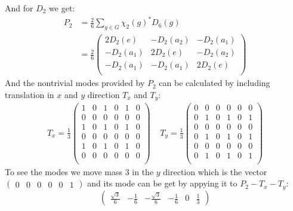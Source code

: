 \documentclass[a4paper]{article}
\theoremstyle{definition}
\theoremstyle{definition}
\theoremstyle{definition}
\theoremstyle{theorem}
\theoremstyle{theorem}
\theoremstyle{definition}
\begin{document}
And for $D_2$ we get:
\begin{align}
    P_2 &= \frac{2}{6} \sum _{g\in G} \chi _{2}(g)^* D_6(g) \nonumber \\
        &=\frac{2}{6}
        \begin{pmatrix}
            2D_2(e) & -D_2(a_2) & -D_2(a_1) \\
            -D_2(a_1) & 2D_2(e) & -D_2(a_2)\\
            -D_2(a_1) & -D_2(a_1) & 2D_2(e) \\
        \end{pmatrix} \nonumber
\end{align}
And the nontrivial modes provided by $P_2$ can be calculated by including translation in $x$ and $y$
direction $T_x$ and $T_y$:
\begin{align}
    T_x = \frac{1}{3}
\begin{pmatrix}
    1 & 0 & 1 & 0 & 1 & 0 \\
    0 & 0 & 0 & 0 & 0 & 0 \\
    1 & 0 & 1 & 0 & 1 & 0 \\
    0 & 0 & 0 & 0 & 0 & 0 \\
    1 & 0 & 1 & 0 & 1 & 0 \\
    0 & 0 & 0 & 0 & 0 & 0 \\
\end{pmatrix}
    \;\;\;\;
    T_y = \frac{1}{3}
\begin{pmatrix}
    0 & 0 & 0 & 0 & 0 & 0 \\
    0 & 1 & 0 & 1 & 0 & 1 \\
    0 & 0 & 0 & 0 & 0 & 0 \\
    0 & 1 & 0 & 1 & 0 & 1 \\
    0 & 0 & 0 & 0 & 0 & 0 \\
    0 & 1 & 0 & 1 & 0 & 1 \\
\end{pmatrix}
\end{align}
To see the modes we move mass $3$ in the $y$ direction which is the vector $\begin{pmatrix}0&0&0&0&0&1\end{pmatrix}$ and its mode can be get by appying it to $P_2 -T_x -T_y$:
\begin{equation}
    \begin{pmatrix}
        \frac{\sqrt{3}}{6}&-\frac{1}{6}& -\frac{\sqrt{3}}{6} & -\frac{1}{6} & 0 & \frac{1}{3}
    \end{pmatrix}
    \label{eig: 3}
\end{equation}
\end{document}
